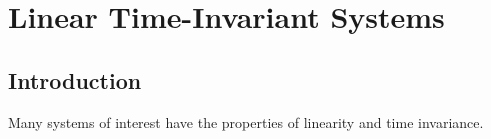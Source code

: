 \chapter{Linear Time-Invariant Systems}

\section{Introduction}
Many systems of interest have the properties of linearity and time invariance.